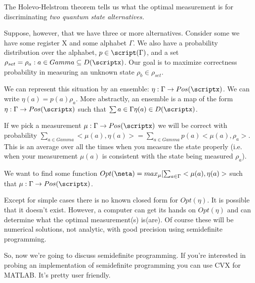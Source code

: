 \begin{section}
    The Holevo-Helstrom theorem tells us what the optimal measurement is
    for discriminating \em{two} quantum state alternatives.

    Suppose, however, that we have three or more alternatives. Consider
    some we have some register X and some alphabet $\Gamma$. We also
    have a probability distribution over the alphabet, $p \in
    \script(\Gamma)$, and a set $\rho_{set} = {\rho_a : a \in Gamma} \subseteq
    D(\scriptx)$. Our goal is to maximize correctness probability in
    measuring an unknown state $\rho_b \in \rho_{set}$. 
    
    We can represent this situation by an ensemble: $\eta: \Gamma
    \rightarrow Pos(\scriptx)$. We can write $\eta(a) = p(a)\rho_a$.
    More abstractly, an ensemble is a map of the form $\eta: \Gamma
    \rightarrow Pos(\scriptx)$ such that $\sum{a\in\Gamma} \eta(a) \in
    D(\scriptx)$.

    If we pick a measurement $\mu: \Gamma \rightarrow Pos(\scriptx)$ we
    will be correct with probability $\sum_{a \in Gamma}
    <\mu(a),\eta(a)> = \sum_{a\in Gamma} p(a) <\mu(a),\rho_a>$. This is
    an average over all the times when you measure the state properly
    (i.e. when your measurement $\mu(a)$ is consistent with the state
    being measured $\rho_a$).

    We want to find some function 
    $Opt(\neta) = max_\mu [ \sum_{a\in \Gamma} <\mu(a), \eta(a)>$ such
    that $\mu: \Gamma \rightarrow Pos(\scriptx)$.

    Except for simple cases there is no known closed form for
    $Opt(\eta)$. It is possible that it doesn't exist. However, a
    computer can get its hands on $Opt(\eta)$ and can determine what the
    optimal measurement(s) is(are). Of course these will be numerical
    solutions, not analytic, with good precision using semidefinite
    programming.

    So, now we're going to discuss semidefinite programming. If you're
    interested in probing an implementation of semidefinite programming
    you can use CVX for MATLAB. It's pretty user friendly.
\end{section}
